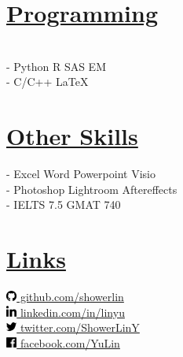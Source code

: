 \documentclass[a4paper, bookmarks=false,hidelinks]{resume} %
\begin{document}
\begin{minipage}[t]{0.27\textwidth}
\section{\underline{Programming}}
\\
 - 
Python \textbullet{}  R \textbullet{} SAS EM\\
 - 
C/C++ \textbullet{} LaTeX\\
\sectionspace %

\section{\underline{Other Skills}}
 - 
Excel \textbullet{} Word \textbullet{} Powerpoint \textbullet{} Visio\\
 - 
Photoshop \textbullet{} Lightroom \textbullet{} Aftereffects\\
 - 
IELTS 7.5 \textbullet{} GMAT 740
 


\sectionspace %


\section{\underline{Links}} 

\href{https://github.com/showerlin}{\includegraphics[height=0.35cm]{icons/icon_github_print} github.com/showerlin} \\
\href{http://in.linkedin.com/in/林禹linyu}{\includegraphics[height=0.35cm]{icons/icon_linkedin_print} linkedin.com/in/linyu} \\
\href{https://twitter.com/ShowerLinY}{\includegraphics[height=0.35cm] {icons/icon_twitter_print} twitter.com/ShowerLinY} \\
\href{https://www.facebook.com/profile.php?id=100012911463832}{\includegraphics[height=0.35cm]{icons/facebook_logo_print} facebook.com/YuLin}

\sectionspace %

\end{minipage} %
\end{document}
